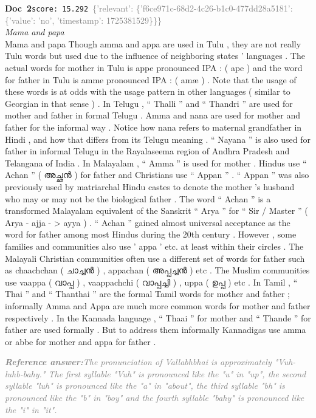 \documentclass[a4paper,11pt]{article}
\begin{document}
\begin{docenv}
{\footnotesize\textcolor{doccolor}{\textbf{Doc~2}}}\hfill{\tiny\texttt{score:~15.292}}\ {\tiny\textcolor{gray}{\{'relevant': \{'f6ce971c-68d2-4c26-b1c0-477dd28a5181': \{'value': 'no', 'timestamp': 1725381529\}\}\}}}\\[3pt]
{\small\textit{Mama and papa}}\\[2pt]
\vspace{2pt}
{\footnotesize Mama and papa
Though amma and appa are used in Tulu , they are not really Tulu words but used due to the influence of neighboring states ' languages . The actual words for mother in Tulu is appe pronounced IPA : ( ape ) and the word for father in Tulu is amme pronounced IPA : ( amæ ) . Note that the usage of these words is at odds with the usage pattern in other languages ( similar to Georgian in that sense ) . In Telugu , `` Thalli '' and `` Thandri '' are used for mother and father in formal Telugu . Amma and nana are used for mother and father for the informal way . Notice how nana refers to maternal grandfather in Hindi , and how that differs from its Telugu meaning . `` Nayana '' is also used for father in informal Telugu in the Rayalaseema region of Andhra Pradesh and Telangana of India . In Malayalam , `` Amma '' is used for mother . Hindus use `` Achan '' ( അച്ഛൻ ) for father and Christians use `` Appan '' . `` Appan '' was also previously used by matriarchal Hindu castes to denote the mother 's husband who may or may not be the biological father . The word `` Achan '' is a transformed Malayalam equivalent of the Sanskrit `` Arya '' for `` Sir / Master '' ( Arya - ajja - > ayya ) . `` Achan '' gained almost universal acceptance as the word for father among most Hindus during the 20th century . However , some families and communities also use ' appa ' etc. at least within their circles . The Malayali Christian communities often use a different set of words for father such as chaachchan ( ചാച്ചൻ ) , appachan ( അപ്പച്ചൻ ) etc . The Muslim communities use vaappa ( വാപ്പ ) , vaappachchi ( വാപ്പച്ചി ) , uppa ( ഉപ്പ ) etc . In Tamil , `` Thai '' and `` Thanthai '' are the formal Tamil words for mother and father ; informally Amma and Appa are much more common words for mother and father respectively . In the Kannada language , `` Thaai '' for mother and `` Thande '' for father are used formally . But to address them informally Kannadigas use amma or abbe for mother and appa for father .}
\end{docenv}
\begin{refanswerenv}
{\footnotesize\textit{\textcolor{gray}{\textbf{Reference answer:}\enspace The pronunciation of Vallabhbhai is approximately "Vuh-luhb-bahy." The first syllable "Vuh" is pronounced like the "u" in "up", the second syllable "luh" is pronounced like the "a" in "about", the third syllable "bh" is pronounced like the "b" in "boy" and the fourth syllable "bahy" is pronounced like the "i" in "it".}}}
\end{refanswerenv}
\end{document}
